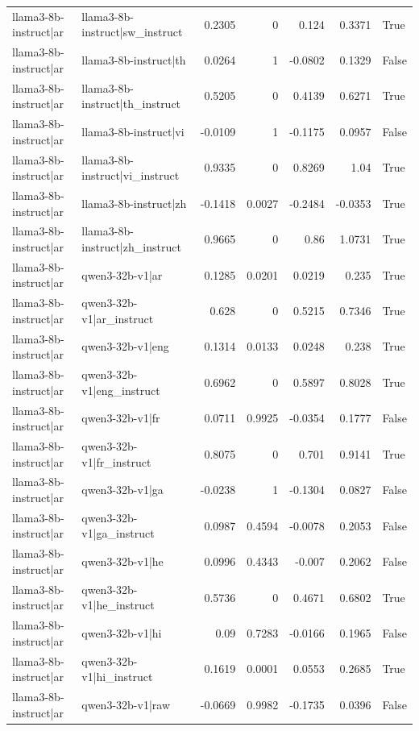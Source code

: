 \begin{table}
\begin{tabular}{l l r r r r l}
llama3-8b-instruct|ar & llama3-8b-instruct|sw_instruct & 0.2305 & 0 & 0.124 & 0.3371 & True \\
llama3-8b-instruct|ar & llama3-8b-instruct|th & 0.0264 & 1 & -0.0802 & 0.1329 & False \\
llama3-8b-instruct|ar & llama3-8b-instruct|th_instruct & 0.5205 & 0 & 0.4139 & 0.6271 & True \\
llama3-8b-instruct|ar & llama3-8b-instruct|vi & -0.0109 & 1 & -0.1175 & 0.0957 & False \\
llama3-8b-instruct|ar & llama3-8b-instruct|vi_instruct & 0.9335 & 0 & 0.8269 & 1.04 & True \\
llama3-8b-instruct|ar & llama3-8b-instruct|zh & -0.1418 & 0.0027 & -0.2484 & -0.0353 & True \\
llama3-8b-instruct|ar & llama3-8b-instruct|zh_instruct & 0.9665 & 0 & 0.86 & 1.0731 & True \\
llama3-8b-instruct|ar & qwen3-32b-v1|ar & 0.1285 & 0.0201 & 0.0219 & 0.235 & True \\
llama3-8b-instruct|ar & qwen3-32b-v1|ar_instruct & 0.628 & 0 & 0.5215 & 0.7346 & True \\
llama3-8b-instruct|ar & qwen3-32b-v1|eng & 0.1314 & 0.0133 & 0.0248 & 0.238 & True \\
llama3-8b-instruct|ar & qwen3-32b-v1|eng_instruct & 0.6962 & 0 & 0.5897 & 0.8028 & True \\
llama3-8b-instruct|ar & qwen3-32b-v1|fr & 0.0711 & 0.9925 & -0.0354 & 0.1777 & False \\
llama3-8b-instruct|ar & qwen3-32b-v1|fr_instruct & 0.8075 & 0 & 0.701 & 0.9141 & True \\
llama3-8b-instruct|ar & qwen3-32b-v1|ga & -0.0238 & 1 & -0.1304 & 0.0827 & False \\
llama3-8b-instruct|ar & qwen3-32b-v1|ga_instruct & 0.0987 & 0.4594 & -0.0078 & 0.2053 & False \\
llama3-8b-instruct|ar & qwen3-32b-v1|he & 0.0996 & 0.4343 & -0.007 & 0.2062 & False \\
llama3-8b-instruct|ar & qwen3-32b-v1|he_instruct & 0.5736 & 0 & 0.4671 & 0.6802 & True \\
llama3-8b-instruct|ar & qwen3-32b-v1|hi & 0.09 & 0.7283 & -0.0166 & 0.1965 & False \\
llama3-8b-instruct|ar & qwen3-32b-v1|hi_instruct & 0.1619 & 0.0001 & 0.0553 & 0.2685 & True \\
llama3-8b-instruct|ar & qwen3-32b-v1|raw & -0.0669 & 0.9982 & -0.1735 & 0.0396 & False \\

\end{tabular}
\end{table}
